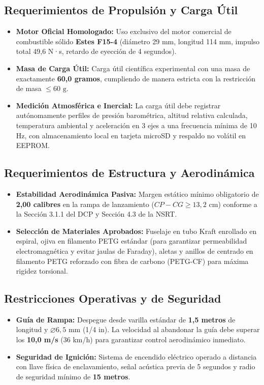 \subsection{Requerimientos de Propulsión y Carga Útil}
\begin{itemize}[leftmargin=1.5em]
    \item \textbf{Motor Oficial Homologado:} Uso exclusivo del motor comercial de combustible sólido \textbf{Estes F15-4} (diámetro 29 mm, longitud 114 mm, impulso total 49,6 N·s, retardo de eyección de 4 segundos).
    \item \textbf{Masa de Carga Útil:} Carga útil científica experimental con una masa de exactamente \textbf{60,0 gramos}, cumpliendo de manera estricta con la restricción de masa $\le 60\text{ g}$.
    \item \textbf{Medición Atmosférica e Inercial:} La carga útil debe registrar autónomamente perfiles de presión barométrica, altitud relativa calculada, temperatura ambiental y aceleración en 3 ejes a una frecuencia mínima de 10 Hz, con almacenamiento local en tarjeta microSD y respaldo no volátil en EEPROM.
\end{itemize}

\subsection{Requerimientos de Estructura y Aerodinámica}
\begin{itemize}[leftmargin=1.5em]
    \item \textbf{Estabilidad Aerodinámica Pasiva:} Margen estático mínimo obligatorio de \textbf{2,00 calibres} en la rampa de lanzamiento ($CP - CG \ge 13,2\text{ cm}$) conforme a la Sección 3.1.1 del DCP y Sección 4.3 de la NSRT.
    \item \textbf{Selección de Materiales Aprobados:} Fuselaje en tubo Kraft enrollado en espiral, ojiva en filamento PETG estándar (para garantizar permeabilidad electromagnética y evitar jaulas de Faraday), aletas y anillos de centrado en filamento PETG reforzado con fibra de carbono (PETG-CF) para máxima rigidez torsional.
\end{itemize}

\subsection{Restricciones Operativas y de Seguridad}
\begin{itemize}[leftmargin=1.5em]
    \item \textbf{Guía de Rampa:} Despegue desde varilla estándar de \textbf{1,5 metros} de longitud y $\varnothing 6,5\text{ mm}$ (1/4 in). La velocidad al abandonar la guía debe superar los \textbf{10,0 m/s} (36 km/h) para garantizar control aerodinámico inmediato.
    \item \textbf{Seguridad de Ignición:} Sistema de encendido eléctrico operado a distancia con llave física de enclavamiento, señal acústica previa de 5 segundos y radio de seguridad mínimo de \textbf{15 metros}.
\end{itemize}
